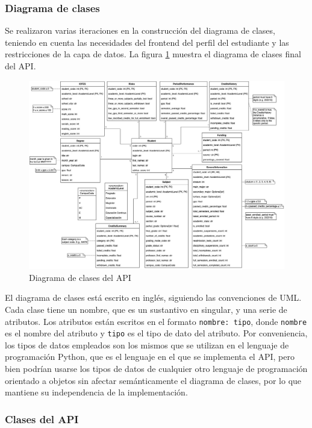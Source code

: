 \subsubsection{Diagrama de clases}

Se realizaron varias iteraciones en la construcción del diagrama de clases, teniendo en cuenta las necesidades del \gls{frontend} del perfil del estudiante y las restricciones de la capa de datos. La figura \ref{fig:diagrama_clases} muestra el diagrama de clases final del \gls{API}.

\begin{figure}[h]
	\centering
	\includegraphics[width=\textwidth]{assets/diagrama-clases.jpg}
	\caption{Diagrama de clases del \gls{API}}
	\label{fig:diagrama_clases}
\end{figure}

El diagrama de clases está escrito en inglés, siguiendo las convenciones de \gls{UML}. Cada clase tiene un nombre, que es un sustantivo en singular, y una serie de atributos. Los atributos están escritos en el formato \lstinline|nombre: tipo|, donde \lstinline|nombre| es el nombre del atributo y \lstinline|tipo| es el tipo de dato del atributo. Por conveniencia, los tipos de datos empleados son los mismos que se utilizan en el lenguaje de programación \gls{Python}, que es el lenguaje en el que se implementa el \gls{API}, pero bien podrían usarse los tipos de datos de cualquier otro lenguaje de programación orientado a objetos sin afectar semánticamente el diagrama de clases, por lo que mantiene su independencia de la implementación.

\subsubsection{Clases del API}

